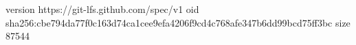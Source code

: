 version https://git-lfs.github.com/spec/v1
oid sha256:cbe794da77f0c163d74ca1cee9efa4206f9cd4c768afe347b6dd99bcd75ff3bc
size 87544
